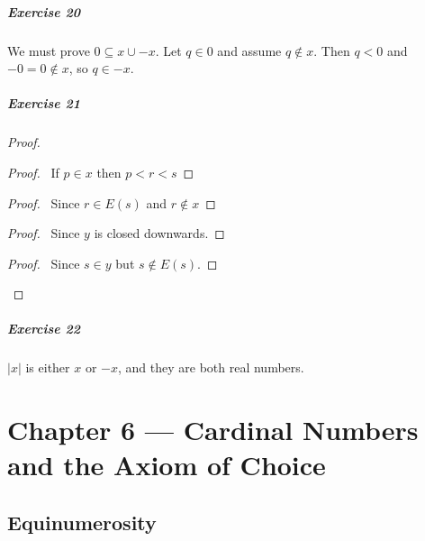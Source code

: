 \documentclass{report}
\begin{document}
    \paragraph{Exercise 20}
    We must prove $0 \subseteq x \cup -x$. Let $q \in 0$ and assume $q \notin x$. Then $q < 0$ and $-0 = 0
    \notin x$, so $q \in -x$.

    \paragraph{Exercise 21}
    \begin{proof}
        \pf
        \begin{proof}
            \pf\ If $p \in x$ then $p < r < s$
        \end{proof}
        \begin{proof}
            \pf\ Since $r \in E(s)$ and $r \notin x$
        \end{proof}
        \begin{proof}
            \pf\ Since $y$ is closed downwards.
        \end{proof}
        \begin{proof}
            \pf\ Since $s \in y$ but $s \notin E(s)$.
        \end{proof}
    \end{proof}

    \paragraph{Exercise 22}
    $|x|$ is either $x$ or $-x$, and they are both real numbers.

    \chapter{Chapter 6 --- Cardinal Numbers and the Axiom of Choice}

    \section{Equinumerosity}
\end{document}
